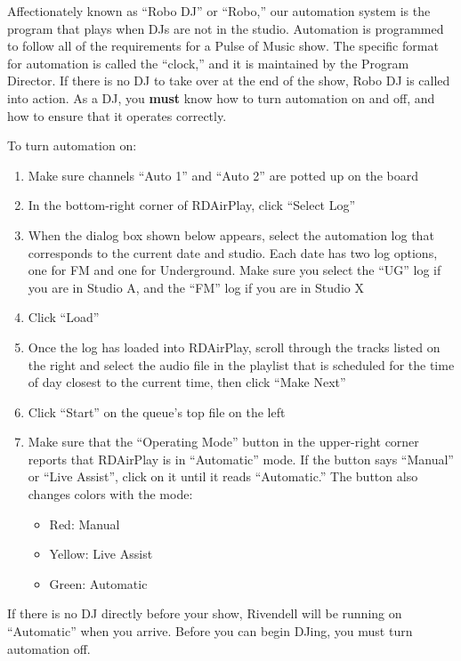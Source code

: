 \documentclass{witrman}
\begin{document}
Affectionately known as ``Robo DJ'' or ``Robo,'' our automation system is the
program that plays when DJs are not in the studio.  Automation is programmed to
follow all of the requirements for a Pulse of Music show.  The specific format
for automation is called the ``clock,'' and it is maintained by the Program
Director.  If there is no DJ to take over at the end of the show, Robo DJ is
called into action.  As a DJ, you \textbf{must} know how to turn automation on
and off, and how to ensure that it operates correctly.

To turn automation on:
\begin{enumerate}
    \item Make sure channels ``Auto 1'' and ``Auto 2'' are potted up on the
        board
    \item In the bottom-right corner of RDAirPlay, click ``Select Log''
    \item When the dialog box shown below appears, select the automation log
        that corresponds to the current date and studio.  Each date has two log
        options, one for FM and one for Underground.  Make sure you select the
        ``UG'' log if you are in Studio A, and the ``FM'' log if you are in
        Studio X
    \item Click ``Load''
    \item Once the log has loaded into RDAirPlay, scroll through the tracks
        listed on the right and select the audio file in the playlist that is
        scheduled for the time of day closest to the current time, then click
        ``Make Next''
    \item Click ``Start'' on the queue's top file on the left
    \item Make sure that the ``Operating Mode'' button in the upper-right corner
        reports that RDAirPlay is in ``Automatic'' mode.  If the button says
        ``Manual'' or ``Live Assist'', click on it until it reads ``Automatic.''
        The button also changes colors with the mode:
        \begin{itemize}
            \item Red: Manual
            \item Yellow: Live Assist
            \item Green: Automatic
        \end{itemize}
\end{enumerate}

If there is no DJ directly before your show, Rivendell will be running on
``Automatic'' when you arrive.  Before you can begin DJing, you must turn
automation off.
\end{document}
